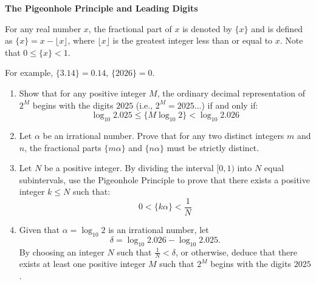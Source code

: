 
\begin{problem}
\textbf{The Pigeonhole Principle and Leading Digits}

For any real number $x$, the fractional part of $x$ is denoted by $\{x\}$ and is defined as $\{x\} = x - \lfloor x \rfloor$, where $\lfloor x \rfloor$ is the greatest integer less than or equal to $x$. Note that $0 \le \{x\} < 1$.

For example, $\{3.14\} = 0.14$, $\{2026\} = 0$.

\begin{enumerate}
    \item[\textbf{(i)}] Show that for any positive integer $M$, the ordinary decimal representation of $2^M$ begins with the digits $2025$ (i.e., $2^M = 2025\dots$) if and only if:
    \[
    \log_{10} 2.025 \le \{M \log_{10} 2\} < \log_{10} 2.026
    \]

    \item[\textbf{(ii)}] Let $\alpha$ be an irrational number. Prove that for any two distinct integers $m$ and $n$, the fractional parts $\{m\alpha\}$ and $\{n\alpha\}$ must be strictly distinct.

    \item[\textbf{(iii)}] Let $N$ be a positive integer. By dividing the interval $[0,1)$ into $N$ equal subintervals, use the Pigeonhole Principle to prove that there exists a positive integer $k \le N$ such that:
    \[
    0 < \{k\alpha\} < \frac{1}{N}
    \]

    \item[\textbf{(iv)}] Given that $\alpha = \log_{10} 2$ is an irrational number, let
    \[
    \delta = \log_{10} 2.026 - \log_{10} 2.025.
    \]
    By choosing an integer $N$ such that $\frac{1}{N} < \delta$, or otherwise, deduce that there exists at least one positive integer $M$ such that $2^M$ begins with the digits $2025$.
\end{enumerate}
\end{problem}

